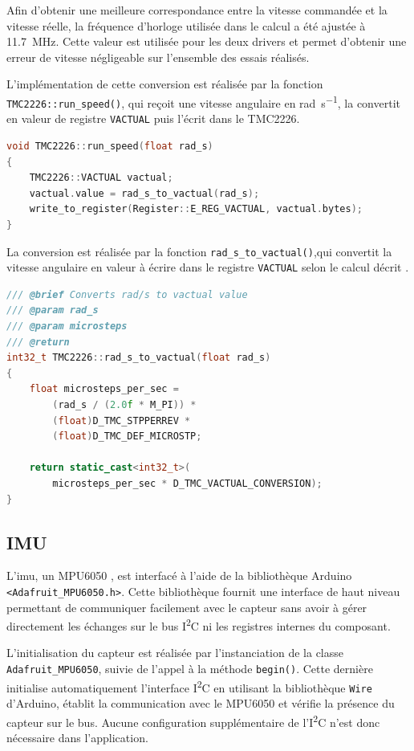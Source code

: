 Afin d'obtenir une meilleure correspondance entre la vitesse commandée et la vitesse réelle, la fréquence d'horloge utilisée dans le calcul a été ajustée à \SI{11.7}{MHz}. Cette valeur est utilisée pour les deux drivers et permet d'obtenir une erreur de vitesse négligeable sur l'ensemble des essais réalisés.

L'implémentation de cette conversion est réalisée par la fonction \texttt{TMC2226::run\_speed()}, qui reçoit une vitesse angulaire en \si{rad.s^{-1}}, la convertit en valeur de registre \texttt{VACTUAL} puis l'écrit dans le TMC2226.
\begin{lstlisting}[language=C++]
void TMC2226::run_speed(float rad_s)
{
    TMC2226::VACTUAL vactual;
    vactual.value = rad_s_to_vactual(rad_s);
    write_to_register(Register::E_REG_VACTUAL, vactual.bytes);
}
\end{lstlisting}

La conversion est réalisée par la fonction \texttt{rad\_s\_to\_vactual()},qui convertit la vitesse angulaire en valeur à écrire dans le registre \texttt{VACTUAL} selon le calcul décrit .

\begin{lstlisting}[language=C++]
/// @brief Converts rad/s to vactual value
/// @param rad_s
/// @param microsteps
/// @return
int32_t TMC2226::rad_s_to_vactual(float rad_s)
{
    float microsteps_per_sec =
        (rad_s / (2.0f * M_PI)) *
        (float)D_TMC_STPPERREV *
        (float)D_TMC_DEF_MICROSTP;

    return static_cast<int32_t>(
        microsteps_per_sec * D_TMC_VACTUAL_CONVERSION);
}
\end{lstlisting}


\subsection{IMU}

L'\acrshort{imu}, un MPU6050 \cite{MPU6050_Datasheet}, est interfacé à l'aide de la bibliothèque Arduino \texttt{<Adafruit\_MPU6050.h>}. Cette bibliothèque fournit une interface de haut niveau permettant de communiquer facilement avec le capteur sans avoir à gérer directement les échanges sur le bus I\textsuperscript{2}C ni les registres internes du composant.

L'initialisation du capteur est réalisée par l'instanciation de la classe \texttt{Adafruit\_MPU6050}, suivie de l'appel à la méthode \texttt{begin()}. Cette dernière initialise automatiquement l'interface I\textsuperscript{2}C en utilisant la bibliothèque \texttt{Wire} d'Arduino, établit la communication avec le MPU6050 et vérifie la présence du capteur sur le bus. Aucune configuration supplémentaire de l'I\textsuperscript{2}C n'est donc nécessaire dans l'application.

